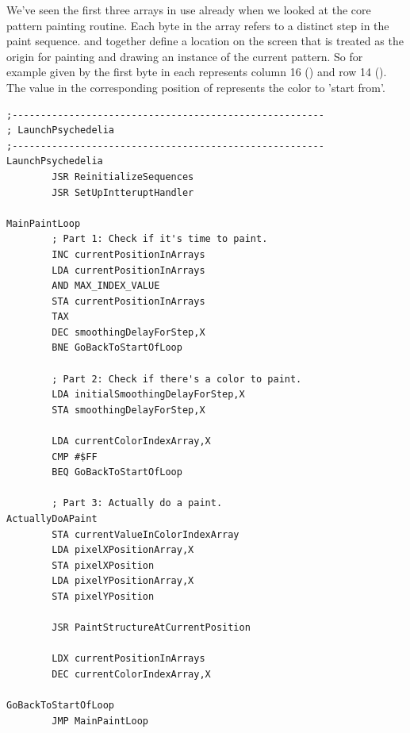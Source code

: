 We've seen the first three arrays in use already when we looked at the core
pattern painting routine. Each byte in the array refers to a distinct step in the paint sequence.
 and  together define a location on the screen
that is treated as the origin for painting and drawing an instance of the current pattern. So for example  given by the
first byte in each represents column 16 () and row 14 (). The value in
the corresponding position of  represents the color to 'start from'.


\clearpage
\begin{lstlisting}[caption= The game's main loop.]
;-------------------------------------------------------
; LaunchPsychedelia
;-------------------------------------------------------
LaunchPsychedelia   
        JSR ReinitializeSequences
        JSR SetUpIntteruptHandler

MainPaintLoop   
        ; Part 1: Check if it's time to paint.
        INC currentPositionInArrays
        LDA currentPositionInArrays
        AND MAX_INDEX_VALUE
        STA currentPositionInArrays
        TAX 
        DEC smoothingDelayForStep,X
        BNE GoBackToStartOfLoop

        ; Part 2: Check if there's a color to paint.
        LDA initialSmoothingDelayForStep,X
        STA smoothingDelayForStep,X

        LDA currentColorIndexArray,X
        CMP #$FF
        BEQ GoBackToStartOfLoop

        ; Part 3: Actually do a paint.
ActuallyDoAPaint
        STA currentValueInColorIndexArray
        LDA pixelXPositionArray,X
        STA pixelXPosition
        LDA pixelYPositionArray,X
        STA pixelYPosition

        JSR PaintStructureAtCurrentPosition

        LDX currentPositionInArrays
        DEC currentColorIndexArray,X

GoBackToStartOfLoop   
        JMP MainPaintLoop

\end{lstlisting}

